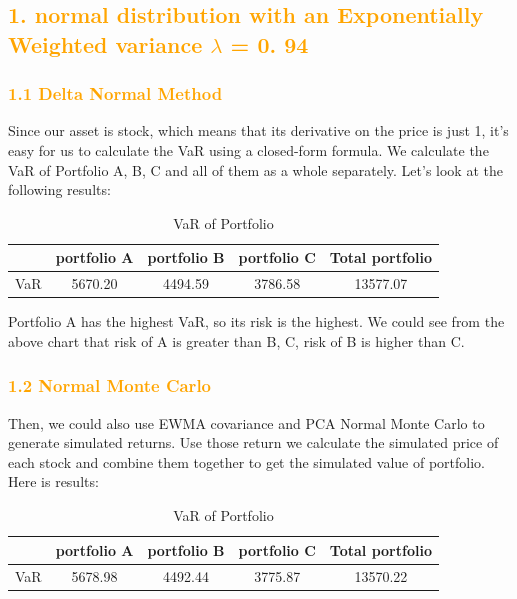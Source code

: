 \documentclass[11pt,en]{elegantpaper}
\begin{document}
\subsection*{\textcolor{orange}{1. normal distribution with an Exponentially Weighted variance $\lambda$ = 0. 94}}

\subsubsection*{\textcolor{orange}{1.1 Delta Normal Method}}

Since our asset is stock, which means that its derivative on the price is just 1, it's easy for us to calculate the VaR using a closed-form formula. We calculate the VaR of Portfolio A, B, C and all of them as a whole separately. Let's look at the following results:

\begin{table}[htbp]
    \centering
    \caption{VaR of Portfolio}
    \begin{tabular}{@{}ccccc@{}}
        \toprule
        \textbf{} & \textbf{portfolio A} & \textbf{portfolio B} & \textbf{portfolio C} & \textbf{Total portfolio}\\
        \midrule
        VaR & 5670.20  & 4494.59 & 3786.58 & 13577.07 \\
        \bottomrule
    \end{tabular}
\end{table}

Portfolio A has the highest VaR, so its risk is the highest. We could see from the above chart that risk of A is greater than B, C, risk of B is higher than C.

\subsubsection*{\textcolor{orange}{1.2 Normal Monte Carlo}}

Then, we could also use EWMA covariance and PCA Normal Monte Carlo to generate simulated returns. Use those return we calculate the simulated price of each stock and combine them together to get the simulated value of portfolio. Here is results:

\begin{table}[htbp]
    \centering
    \caption{VaR of Portfolio}
    \begin{tabular}{@{}ccccc@{}}
        \toprule
        \textbf{} & \textbf{portfolio A} & \textbf{portfolio B} & \textbf{portfolio C} & \textbf{Total portfolio}\\
        \midrule
        VaR & 5678.98  & 4492.44 & 3775.87 & 13570.22 \\
        \bottomrule
    \end{tabular}
\end{table}
\end{document}
